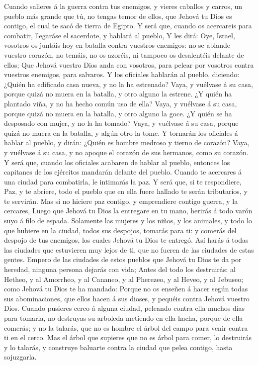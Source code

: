  Cuando salieres á la guerra contra tus enemigos, y vieres
caballos y carros, un pueblo más grande que tú, no tengas temor de
ellos, que Jehová tu Dios es contigo, el cual te sacó de tierra de
Egipto.  Y será que, cuando os acercareis para combatir,
llegaráse el sacerdote, y hablará al pueblo,  Y les dirá:
Oye, Israel, vosotros os juntáis hoy en batalla contra vuestros
enemigos: no se ablande vuestro corazón, no temáis, no os azoréis, ni
tampoco os desalentéis delante de ellos;  Que Jehová
vuestro Dios anda con vosotros, para pelear por vosotros contra vuestros
enemigos, para salvaros.  Y los oficiales hablarán al
pueblo, diciendo: ¿Quién ha edificado casa nueva, y no la ha estrenado?
Vaya, y vuélvase á su casa, porque quizá no muera en la batalla, y otro
alguno la estrene.  ¿Y quién ha plantado viña, y no ha
hecho común uso de ella? Vaya, y vuélvase á su casa, porque quizá no
muera en la batalla, y otro alguno la goce.  ¿Y quién se
ha desposado con mujer, y no la ha tomado? Vaya, y vuélvase á su casa,
porque quizá no muera en la batalla, y algún otro la tome.
 Y tornarán los oficiales á hablar al pueblo, y dirán:
¿Quién es hombre medroso y tierno de corazón? Vaya, y vuélvase á su
casa, y no apoque el corazón de sus hermanos, como su corazón.
 Y será que, cuando los oficiales acabaren de hablar al
pueblo, entonces los capitanes de los ejércitos mandarán delante del
pueblo.  Cuando te acercares á una ciudad para
combatirla, le intimarás la paz.  Y será que, si te
respondiere, Paz, y te abriere, todo el pueblo que en ella fuere hallado
te serán tributarios, y te servirán.  Mas si no hiciere
paz contigo, y emprendiere contigo guerra, y la cercares,
 Luego que Jehová tu Dios la entregare en tu mano,
herirás á todo varón suyo á filo de espada.  Solamente
las mujeres y los niños, y los animales, y todo lo que hubiere en la
ciudad, todos sus despojos, tomarás para ti: y comerás del despojo de
tus enemigos, los cuales Jehová tu Dios te entregó.  Así
harás á todas las ciudades que estuvieren muy lejos de ti, que no fueren
de las ciudades de estas gentes.  Empero de las ciudades
de estos pueblos que Jehová tu Dios te da por heredad, ninguna persona
dejarás con vida;  Antes del todo los destruirás: al
Hetheo, y al Amorrheo, y al Cananeo, y al Pherezeo, y al Heveo, y al
Jebuseo; como Jehová tu Dios te ha mandado:  Porque no os
enseñen á hacer según todas sus abominaciones, que ellos hacen á sus
dioses, y pequéis contra Jehová vuestro Dios.  Cuando
pusieres cerco á alguna ciudad, peleando contra ella muchos días para
tomarla, no destruyas su arboleda metiendo en ella hacha, porque de ella
comerás; y no la talarás, que no es hombre el árbol del campo para venir
contra ti en el cerco.  Mas el árbol que supieres que no
es árbol para comer, lo destruirás y lo talarás, y construye baluarte
contra la ciudad que pelea contigo, hasta sojuzgarla.

